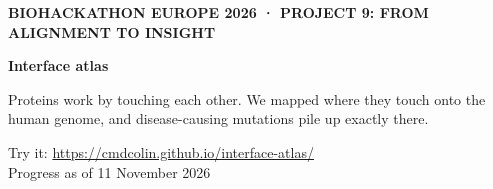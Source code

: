 \documentclass[10pt,aspectratio=169]{beamer}
\begin{document}
\begin{frame}[plain]
  \vspace{6mm}
  {\scriptsize\bfseries\color{accent}BIOHACKATHON EUROPE 2026 · PROJECT 9: FROM ALIGNMENT TO INSIGHT\par}
  \vspace{3mm}
  {\huge\bfseries Interface atlas\par}
  \vspace{4mm}
  \begin{minipage}{128mm}
    \raggedright\Large
    Proteins work by touching each other. We mapped where they touch onto the
    human genome, and disease-causing mutations pile up exactly there.
  \end{minipage}

  \vspace{8mm}
  {\small\color{mute}Try it: \url{https://cmdcolin.github.io/interface-atlas/}\\
  Progress as of 11 November 2026\par}
\end{frame}
\end{document}
